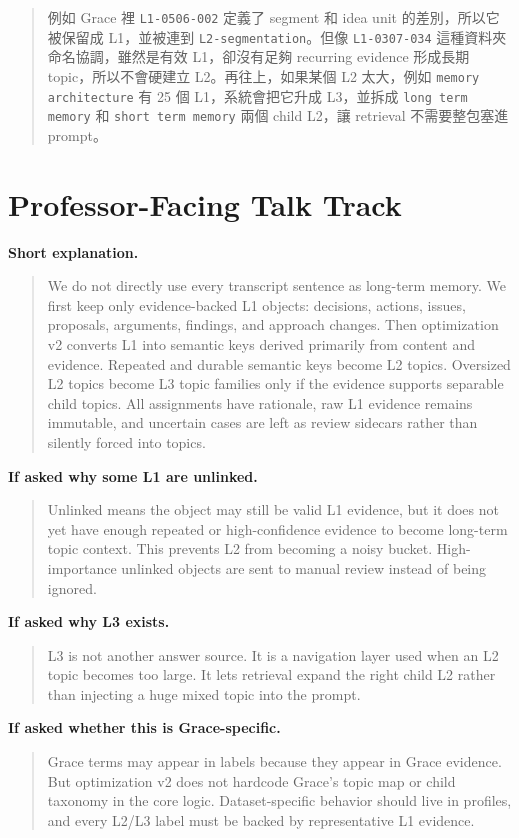 \documentclass[11pt,a4paper]{article}
\newcommand{\code}[1]{{\footnotesize\texttt{#1}}}
\begin{document}
\begin{quote}
例如 Grace 裡 \code{L1-0506-002} 定義了 segment 和 idea unit 的差別，所以它被保留成 L1，並被連到 \code{L2-segmentation}。但像 \code{L1-0307-034} 這種資料夾命名協調，雖然是有效 L1，卻沒有足夠 recurring evidence 形成長期 topic，所以不會硬建立 L2。再往上，如果某個 L2 太大，例如 \code{memory architecture} 有 25 個 L1，系統會把它升成 L3，並拆成 \code{long term memory} 和 \code{short term memory} 兩個 child L2，讓 retrieval 不需要整包塞進 prompt。
\end{quote}

\section{Professor-Facing Talk Track}

\textbf{Short explanation.}

\begin{quote}
We do not directly use every transcript sentence as long-term memory. We first keep only evidence-backed L1 objects: decisions, actions, issues, proposals, arguments, findings, and approach changes. Then optimization v2 converts L1 into semantic keys derived primarily from content and evidence. Repeated and durable semantic keys become L2 topics. Oversized L2 topics become L3 topic families only if the evidence supports separable child topics. All assignments have rationale, raw L1 evidence remains immutable, and uncertain cases are left as review sidecars rather than silently forced into topics.
\end{quote}

\textbf{If asked why some L1 are unlinked.}

\begin{quote}
Unlinked means the object may still be valid L1 evidence, but it does not yet have enough repeated or high-confidence evidence to become long-term topic context. This prevents L2 from becoming a noisy bucket. High-importance unlinked objects are sent to manual review instead of being ignored.
\end{quote}

\textbf{If asked why L3 exists.}

\begin{quote}
L3 is not another answer source. It is a navigation layer used when an L2 topic becomes too large. It lets retrieval expand the right child L2 rather than injecting a huge mixed topic into the prompt.
\end{quote}

\textbf{If asked whether this is Grace-specific.}

\begin{quote}
Grace terms may appear in labels because they appear in Grace evidence. But optimization v2 does not hardcode Grace's topic map or child taxonomy in the core logic. Dataset-specific behavior should live in profiles, and every L2/L3 label must be backed by representative L1 evidence.
\end{quote}
\end{document}
